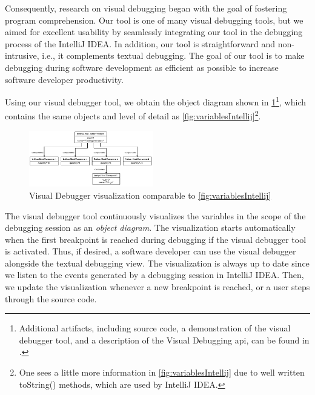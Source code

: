 \documentclass[conference]{IEEEtran}
\newcommand{\intellij}{IntelliJ IDEA}
\begin{document}
Consequently, research on visual debugging began with the goal of fostering program comprehension.
Our tool is one of many visual debugging tools, but we aimed for excellent usability by seamlessly integrating our tool in the debugging process of the \intellij{}.
In addition, our tool is straightforward and non-intrusive, i.e., it complements textual debugging.
The goal of our tool is to make debugging during software development as efficient as possible to increase software developer productivity.

Using our visual debugger tool, we obtain the object diagram shown in \cref{fig:visualDebuggerVariables}\footnote{\label{footnote:artifacts} Additional artifacts, including source code, a demonstration of the visual debugger tool, and a description of the Visual Debugging \acrshort*{api}, can be found in \cite{ArtifactsICSME2022}.}, which contains the same objects and level of detail as \cref{fig:variablesIntellij}\footnote{One sees a little more information in \cref{fig:variablesIntellij} due to well written \textsf{toString()} methods, which are used by \intellij{}.}.

\begin{figure}[h]
    \centering
    \includegraphics[width=0.48\textwidth]{images/VD-partsList-objects.pdf}
    \caption{Visual Debugger visualization comparable to \cref{fig:variablesIntellij}}
    \label{fig:visualDebuggerVariables}
\end{figure}

The visual debugger tool continuously visualizes the variables in the scope of the debugging session as an \textit{object diagram}.
The visualization starts automatically when the first breakpoint is reached during debugging if the visual debugger tool is activated.
Thus, if desired, a software developer can use the visual debugger alongside the textual debugging view.
The visualization is always up to date since we listen to the events generated by a debugging session in \intellij{}.
Then, we update the visualization whenever a new breakpoint is reached, or a user steps through the source code.
\end{document}
